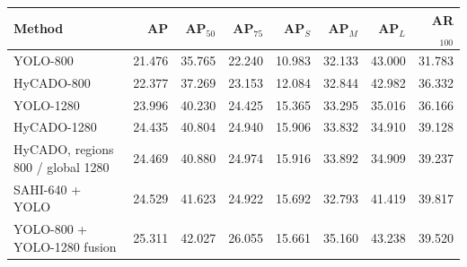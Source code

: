\begin{tabular}{lrrrrrrr}
\toprule
Method & AP & AP$_{50}$ & AP$_{75}$ & AP$_S$ & AP$_M$ & AP$_L$ & AR$_{100}$\\
\midrule
YOLO-800 & 21.476 & 35.765 & 22.240 & 10.983 & 32.133 & 43.000 & 31.783\\
HyCADO-800 & 22.377 & 37.269 & 23.153 & 12.084 & 32.844 & 42.982 & 36.332\\
YOLO-1280 & 23.996 & 40.230 & 24.425 & 15.365 & 33.295 & 35.016 & 36.166\\
HyCADO-1280 & 24.435 & 40.804 & 24.940 & 15.906 & 33.832 & 34.910 & 39.128\\
HyCADO, regions 800 / global 1280 & 24.469 & 40.880 & 24.974 & 15.916 & 33.892 & 34.909 & 39.237\\
SAHI-640 + YOLO & 24.529 & 41.623 & 24.922 & 15.692 & 32.793 & 41.419 & 39.817\\
YOLO-800 + YOLO-1280 fusion & 25.311 & 42.027 & 26.055 & 15.661 & 35.160 & 43.238 & 39.520\\
\bottomrule
\end{tabular}
